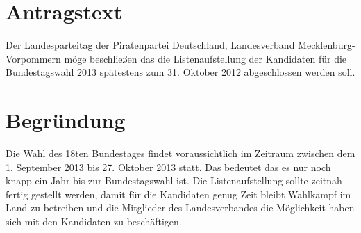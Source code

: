 \section{Antragstext}

Der Landesparteitag der Piratenpartei Deutschland, Landesverband Mecklenburg-Vorpommern möge beschließen das die Listenaufstellung der Kandidaten für die Bundestagswahl 2013 spätestens zum 31. Oktober 2012 abgeschlossen werden soll.

\section{Begründung}

Die Wahl des 18ten Bundestages findet voraussichtlich im Zeitraum zwischen dem 1. September 2013 bis 27. Oktober 2013 statt. Das bedeutet das es nur noch knapp ein Jahr bis zur Bundestagswahl ist. Die Listenaufstellung sollte zeitnah fertig gestellt werden, damit für die Kandidaten genug Zeit bleibt Wahlkampf im Land zu betreiben und die Mitglieder des Landesverbandes die Möglichkeit haben sich mit den Kandidaten zu beschäftigen.

